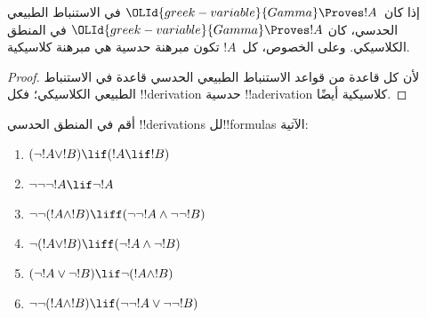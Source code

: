 \documentclass[../../../include/open-logic-section]{subfiles}
\begin{document}
\begin{prop}
  إذا كان~$\OLId{greek-variable}{Gamma} \Proves !A$ في الاستنباط الطبيعي الحدسي، كان
  $\OLId{greek-variable}{Gamma} \Proves !A$ في المنطق الكلاسيكي. وعلى الخصوص، كل~$!A$
  تكون مبرهنة حدسية هي مبرهنة كلاسيكية.
\end{prop}

\begin{proof}
  لأن كل قاعدة من قواعد الاستنباط الطبيعي الحدسي قاعدة في الاستنباط
  الطبيعي الكلاسيكي؛ فكل !!{derivation} حدسية !!a{derivation}
  كلاسيكية أيضًا.
\end{proof}

\begin{prob}
  أقم في المنطق الحدسي !!{derivation}s لل!!{formula}s الآتية:
  \begin{enumerate}
    \item $(\lnot !A \lor !B) \lif (!A \lif !B)$
    \item $\lnot\lnot\lnot !A \lif \lnot !A$
    \item $\lnot\lnot (!A \land !B) \liff (\lnot\lnot !A\land \lnot \lnot !B)$
    \item $\lnot (!A \lor !B) \liff (\lnot !A \land \lnot !B)$
    \item $(\lnot !A \lor \lnot !B) \lif \lnot (!A \land !B)$
    \item $\lnot\lnot ( !A \land !B) \lif  (\lnot\lnot !A \lor
    \lnot\lnot !B)$
  \end{enumerate}
\end{prob}
\end{document}
